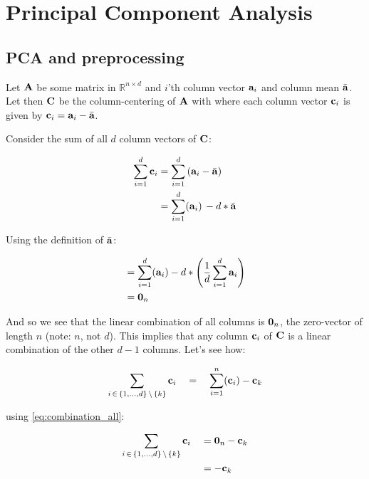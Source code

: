 \section{Principal Component Analysis}



\subsection{PCA and preprocessing}

Let $\mathbf{A}$ be some matrix in $\mathbb R^{n \times d}$ and $i$'th column vector
$\mathbf{a}_i$ and column mean $\bar{\mathbf{a}}$. Let then $\mathbf{C}$ be the
column-centering of $\mathbf{A}$ with where each column vector $\mathbf{c}_i$ is given
by $\mathbf{c}_i = \mathbf{a}_i - \bar{\mathbf{a}}$.


Consider the sum of all $d$ column vectors of $\mathbf{C}$:

\begin{align*}
  \sum_{i = 1}^d \mathbf{c}_i &= \sum_{i = 1}^d \left(\mathbf{a}_i - \bar{\mathbf{a}}\right)\\
                          &= \sum_{i = 1}^d (\mathbf{a}_i) \,  - d * \bar{\mathbf{a}}
\end{align*}

Using the definition of $\bar {\mathbf{a}}$:

\begin{align}
  &= \sum_{i = 1}^d (\mathbf{a}_i) - d * \left(\frac{1}{d}\sum_{i = 1}^d \mathbf{a}_i \right)\nonumber\\
  &= \mathbf{0}_n \label{eq:combination_all}
\end{align}

And so we see that the linear combination of all columns is $\mathbf{0}_n$, the
zero-vector of length $n$ (note: $n$, not $d$). This implies that any column
$\mathbf{c}_i$ of $\mathbf{C}$ is a linear combination of the other $d - 1$ columns.
Let's see how:


\begin{align*}
  \sum_{i\, \in\, \{1, \dots, d\}\, \setminus\, \{k\}} \mathbf{c}_i \quad&=\quad \sum_{i =
  1}^n (\mathbf{c}_i) - \mathbf{c}_k\\
\end{align*}

using \cref{eq:combination_all}:


\begin{align*}
  \sum_{i\, \in\, \{1, \dots, d\}\, \setminus\, \{k\}} \mathbf{c}_i \quad         &= \mathbf{0}_n - \mathbf{c}_k\\
           &= - \mathbf{c}_k
\end{align*}

